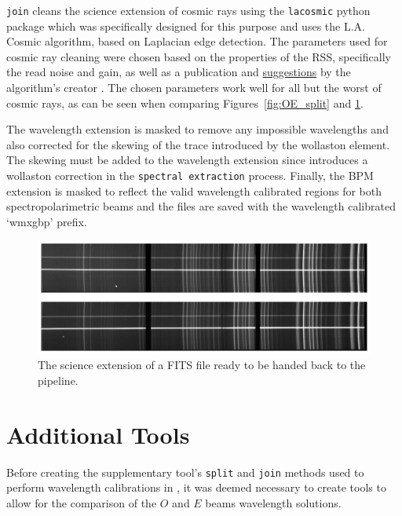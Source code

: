 \texttt{join} cleans the science extension of cosmic rays using the \texttt{lacosmic} python package which was specifically designed for this purpose and uses the L.A. Cosmic algorithm, based on Laplacian edge detection. The parameters used for cosmic ray cleaning were chosen based on the properties of the \gls{RSS}, specifically the read noise and gain, as well as a publication and \hyperlink{http://www.astro.yale.edu/dokkum/lacosmic/pars.html}{suggestions} by the algorithm's creator \citep{lacosmic}. The chosen parameters work well for all but the worst of cosmic rays, as can be seen when comparing Figures~\ref{fig:OE_split} and \ref{fig:polsalt_post_wav_cal}.
\prgph

The wavelength extension is masked to remove any impossible wavelengths and also corrected for the skewing of the trace introduced by the wollaston element. The skewing must be added to the wavelength extension since \polsalt introduces a wollaston correction in the \texttt{spectral extraction} process. Finally, the \gls{BPM} extension is masked to reflect the valid wavelength calibrated regions for both spectropolarimetric beams and the files are saved with the \polsalt wavelength calibrated `wmxgbp' prefix.

\begin{figure}[t]
    \centering
    \includegraphics[width = 1.0\textwidth]{figures/3_post_wav_cal.pdf}
    \caption{The science extension of a \gls{FITS} file ready to be handed back to the \polsalt pipeline.}
    \label{fig:polsalt_post_wav_cal}
\end{figure}


\section{Additional Tools}\label{sec:add_tools}

Before creating the supplementary tool's \texttt{split} and \texttt{join} methods used to perform wavelength calibrations in \iraf, it was deemed necessary to create tools to allow for the comparison of the $O$ and $E$ beams wavelength solutions.

